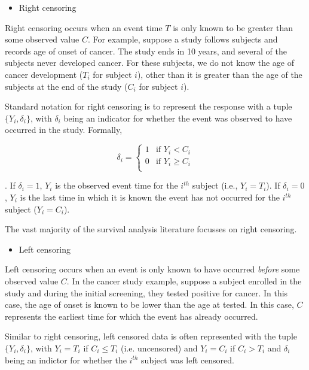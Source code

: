 \documentclass[a4paper]{article}
\begin{document}
  \begin{itemize}
  \item Right censoring
  \end{itemize}
  
  Right censoring occurs when an event time $T$ is only known to be greater than some observed value $C$. For example, suppose a study follows subjects and records age of onset of cancer. The study ends in 10 years, and several of the subjects never developed cancer. For these subjects, we do not know the age of cancer development ($T_i$ for subject $i$), other than it is greater than the age of the subjects at the end of the study ($C_i$ for subject $i$). 

  Standard notation for right censoring is to represent the response with a tuple $\{Y_i, \delta_i\}$, with $\delta_i$ being an indicator for whether the event was observed to have occurred in the study. Formally, 
  
  \[
  \delta_i = 
  \begin{cases}
  1 & \text{if } Y_i < C_i \\
  0 & \text{if } Y_i \geq C_i\\
  \end{cases}
  \]
  
  . If $\delta_i = 1$, $Y_i$ is the observed event time for the $i^{th}$ subject (i.e., $Y_i = T_i$). If $\delta_i = 0$, $Y_i$ is the last time in which it is known the event has not occurred for the $i^{th}$ subject ($Y_i = C_i$). 

  The vast majority of the survival analysis literature focusses on right censoring. 

  \begin{itemize}
  \item Left censoring
  \end{itemize}

  Left censoring occurs when an event is only known to have occurred \emph{before} some observed value $C$. In the cancer study example, suppose a subject enrolled in the study and during the initial screening, they tested positive for cancer. In this case, the age of onset is known to be lower than the age at tested. In this case, $C$ represents the earliest time for which the event has already occurred. 
  
  Similar to right censoring, left censored data is often represented with the tuple $\{Y_i, \delta_i\}$, with $Y_i = T_i$ if $C_i \leq T_i$ (i.e. uncensored) and $Y_i = C_i$ if $C_i > T_i$  and  $\delta_i$ being an indictor for whether the $i^{th}$ subject was left censored. 
\end{document}
